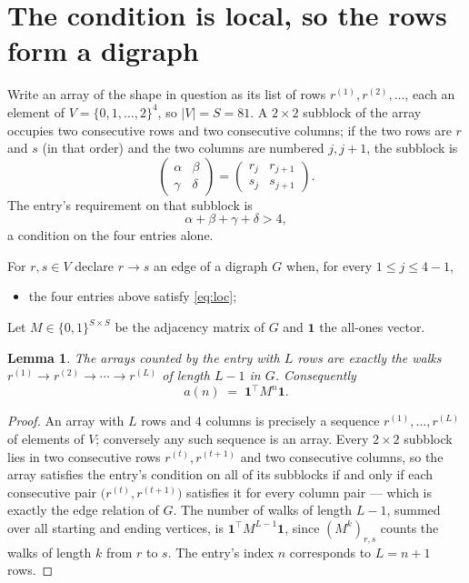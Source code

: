 \documentclass[11pt,a4paper]{article}
\theoremstyle{plain}
\newtheorem{lemma}[theorem]{Lemma}
\theoremstyle{definition}
\begin{document}
\section{The condition is local, so the rows form a digraph}

Write an array of the shape in question as its list of rows
$r^{(1)},r^{(2)},\dots$, each an element of
$V=\{0,1,\dots,2\}^{4}$, so $|V|=S=81$. A $2\times2$ subblock of the array
occupies two consecutive rows and two consecutive columns; if the two rows are $r$
and $s$ (in that order) and the two columns are numbered $j,j+1$,
the subblock is
\[
\begin{pmatrix}\alpha&\beta\\\gamma&\delta\end{pmatrix}=\begin{pmatrix}r_j&r_{j+1}\\s_j&s_{j+1}\end{pmatrix}.
\]
The entry's requirement on that subblock is
\begin{equation}\label{eq:loc}
\alpha+\beta+\gamma+\delta>4,
\end{equation}
a condition on the four entries alone.

For $r,s\in V$ declare $r\to s$ an edge of a digraph $G$ when, for every
$1\le j\le 4-1$,
\begin{itemize}
\item the four entries above satisfy \eqref{eq:loc};

\end{itemize}
Let $M\in\{0,1\}^{S\times S}$ be the adjacency matrix of $G$ and $\mathbf{1}$ the
all-ones vector.

\begin{lemma}\label{lem:walk}
The arrays counted by the entry with $L$ rows are exactly the walks
$r^{(1)}\to r^{(2)}\to\cdots\to r^{(L)}$ of length $L-1$ in $G$. Consequently
\[
a(n)\;=\;\mathbf{1}^{\!\top}M^{n}\mathbf{1} .
\]
\end{lemma}

\begin{proof}
An array with $L$ rows and $4$ columns is precisely a sequence
$r^{(1)},\dots,r^{(L)}$ of elements of $V$; conversely any such sequence is an array.
Every $2\times2$ subblock lies in two consecutive rows $r^{(t)},r^{(t+1)}$ and two
consecutive columns, so the array satisfies the entry's condition on all of its subblocks
if and only if each consecutive pair $\bigl(r^{(t)},r^{(t+1)}\bigr)$ satisfies it for
every column pair --- which is exactly the edge relation of $G$. The number of walks of
length $L-1$, summed over all starting and ending vertices, is
$\mathbf{1}^{\!\top}M^{L-1}\mathbf{1}$, since $(M^{k})_{r,s}$ counts the walks of
length $k$ from $r$ to $s$. The entry's index $n$ corresponds to $L=n+1$ rows.
\end{proof}
\end{document}
